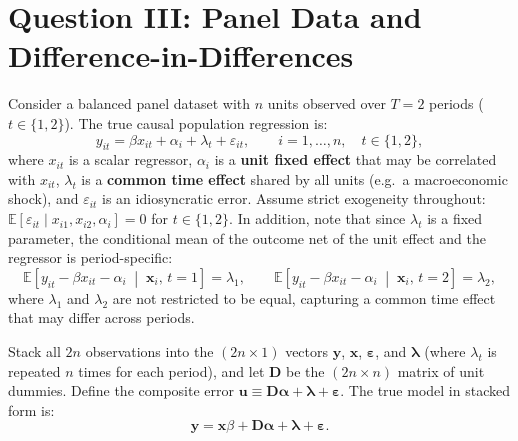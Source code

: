 \documentclass[letterpaper,12pt]{article}
\theoremstyle{dotlessS}
\begin{document}
\section*{Question III: Panel Data and Difference-in-Differences}

Consider a balanced panel dataset with $n$ units observed over $T=2$ periods ($t \in \{1,2\}$). The true causal population regression is:
\begin{equation*}
    y_{it} = \beta x_{it} + \alpha_i + \lambda_t + \varepsilon_{it}, \qquad i=1,\ldots,n,\quad t \in \{1,2\},
\end{equation*}
where $x_{it}$ is a scalar regressor, $\alpha_i$ is a \textbf{unit fixed effect} that may be correlated with $x_{it}$, $\lambda_t$ is a \textbf{common time effect} shared by all units (e.g.\ a macroeconomic shock), and $\varepsilon_{it}$ is an idiosyncratic error. Assume strict exogeneity throughout: $\mathbb{E}[\varepsilon_{it} \mid x_{i1}, x_{i2}, \alpha_i] = 0$ for $t \in \{1,2\}$. In addition, note that since $\lambda_t$ is a fixed parameter, the conditional mean of the outcome net of the unit effect and the regressor is period-specific:
\begin{equation*}
    \mathbb{E}\!\left[y_{it} - \beta x_{it} - \alpha_i \;\middle|\; \bm{x}_i,\, t=1\right] = \lambda_1, \qquad \mathbb{E}\!\left[y_{it} - \beta x_{it} - \alpha_i \;\middle|\; \bm{x}_i,\, t=2\right] = \lambda_2,
\end{equation*}
where $\lambda_1$ and $\lambda_2$ are not restricted to be equal, capturing a common time effect that may differ across periods.

\medskip
\noindent Stack all $2n$ observations into the $(2n \times 1)$ vectors $\bm{y}$, $\bm{x}$, $\bm{\varepsilon}$, and $\bm{\lambda}$ (where $\lambda_t$ is repeated $n$ times for each period), and let $\bm{D}$ be the $(2n \times n)$ matrix of unit dummies. Define the composite error $\bm{u} \equiv \bm{D}\bm{\alpha} + \bm{\lambda} + \bm{\varepsilon}$. The true model in stacked form is:
\begin{equation*}
    \bm{y} = \bm{x}\beta + \bm{D}\bm{\alpha} + \bm{\lambda} + \bm{\varepsilon}.
\end{equation*}
\end{document}
